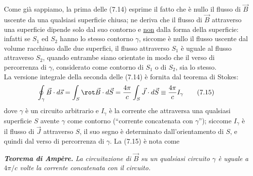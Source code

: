Come gi\`a sappiamo, la prima delle (7.14) esprime il fatto che \`e nullo il
flusso di $\vec B$ uscente da una qualsiasi superficie chiusa; ne deriva che il
flusso di $\vec B$ attraverso una superficie dipende solo dal suo contorno e
\underline{non} dalla forma della superficie: infatti se $S_1$ ed $S_2$ hanno lo
stesso contorno $\gamma$, siccome \`e nullo il flusso uscente dal volume
racchiuso dalle due superfici, il flusso attraverso $S_1$ \`e uguale al flusso
attraverso $S_2$, quando entrambe siano orientate in modo che il verso di
percorrenza di $\gamma$, considerato come contorno di $S_1$ o di $S_2$, sia lo
stesso.\\
La versione integrale della seconda delle (7.14) \`e fornita dal teorema di
Stokes:
\begin{equation}
  \oint_\gamma\vec B\cdot d\vec s=\int_S\rot\vec B\cdot d\vec S
  =\frac{4\pi}{c}\int_S\vec J\cdot d\vec S\equiv\frac{4\pi}{c}I_\gamma
  \tag{7.15}
\end{equation}
dove $\gamma$ \`e un circuito arbitrario e $I_\gamma$ \`e la corrente che
attraversa una qualsiasi superficie $S$ avente $\gamma$ come contorno
(``corrente concatenata con $\gamma$''); siccome $I_\gamma$ \`e il flusso di
$\vec J$ attraverso $S$, il suo segno \`e determinato dall'orientamento di $S$,
e quindi dal verso di percorrenza di $\gamma$. La (7.15) \`e nota come

\textbf{\textit{Teorema di Amp\`ere.}} \textit{La circuitazione di $\vec B$ su
un qualsiasi circuito $\gamma$ \`e uguale a $4\pi/c$ volte la corrente
concatenata con il circuito.}

